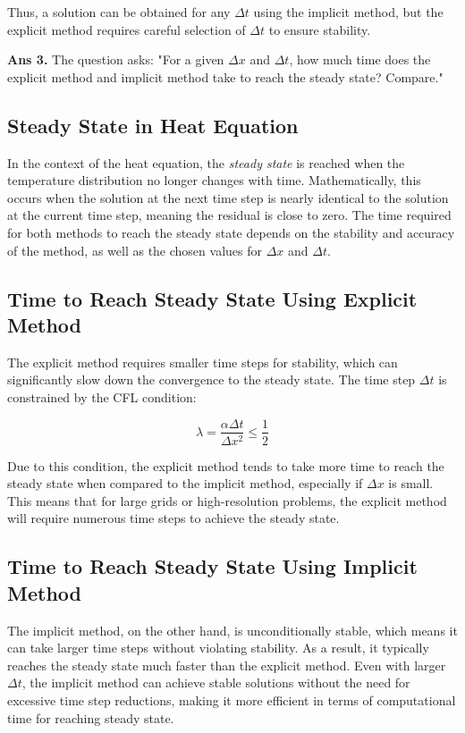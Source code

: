 \documentclass[12pt]{article}
\begin{document}
Thus, a solution can be obtained for any \( \Delta t \) using the implicit method, but the explicit method requires careful selection of \( \Delta t \) to ensure stability.

\textbf{Ans 3.}  The question asks: "For a given \( \Delta x \) and \( \Delta t \), how much time does the explicit method and implicit method take to reach the steady state? Compare."

\subsection*{Steady State in Heat Equation}
In the context of the heat equation, the \textit{steady state} is reached when the temperature distribution no longer changes with time. Mathematically, this occurs when the solution at the next time step is nearly identical to the solution at the current time step, meaning the residual is close to zero. The time required for both methods to reach the steady state depends on the stability and accuracy of the method, as well as the chosen values for \( \Delta x \) and \( \Delta t \).

\subsection*{Time to Reach Steady State Using Explicit Method}
The explicit method requires smaller time steps for stability, which can significantly slow down the convergence to the steady state. The time step \( \Delta t \) is constrained by the CFL condition:

\[
\lambda = \frac{\alpha \Delta t}{\Delta x^2} \leq \frac{1}{2}
\]

Due to this condition, the explicit method tends to take more time to reach the steady state when compared to the implicit method, especially if \( \Delta x \) is small. This means that for large grids or high-resolution problems, the explicit method will require numerous time steps to achieve the steady state.

\subsection*{Time to Reach Steady State Using Implicit Method}
The implicit method, on the other hand, is unconditionally stable, which means it can take larger time steps without violating stability. As a result, it typically reaches the steady state much faster than the explicit method. Even with larger \( \Delta t \), the implicit method can achieve stable solutions without the need for excessive time step reductions, making it more efficient in terms of computational time for reaching steady state.
\end{document}
